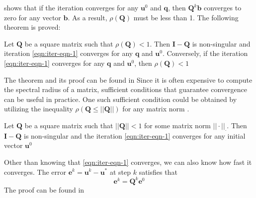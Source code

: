 shows that if the iteration converges for any $\boldsymbol{u}^0$ and $\boldsymbol{q}$, then $\boldsymbol{Q}^k\boldsymbol{b}$ converges to zero for any vector $\boldsymbol{b}$. As a result, $\rho(\boldsymbol{Q})$ must be less than 1. The following theorem is proved:
\begin{theorem}
Let $\boldsymbol{Q}$ be a square matrix such that $\rho(\boldsymbol{Q}) < 1$. Then $\boldsymbol{I} - \boldsymbol{Q}$ is non-singular and iteration \autoref{eqn:iter-eqn-1} converges for any $
\boldsymbol{q}$ and $\boldsymbol{u}^0$. Conversely, if the iteration \autoref{eqn:iter-eqn-1} converges for any $\boldsymbol{q}$ and $\boldsymbol{u}^0$, then $\rho(\boldsymbol{Q}) < 1$
\end{theorem}
The theorem and its proof can be found in \citep{doi:10.1137/1.9780898718003}
Since it is often expensive to compute the spectral radius of a matrix, sufficient conditions that guarantee convergence can be useful in practice. One such sufficient condition could be obtained by utilizing the inequality $\rho(\boldsymbol{Q} \leq ||\boldsymbol{Q}||)$ for any matrix norm \citep{doi:10.1137/1.9780898718003}.
\begin{corollary}
Let $\boldsymbol{Q}$ be a square matrix such that $||\boldsymbol{Q}|| < 1$  for some matrix norm $||\cdot||_\cdot$. Then $\boldsymbol{I} - \boldsymbol{Q}$ is non-singular and the iteration \autoref{eqn:iter-eqn-1} converges for any initial vector $\boldsymbol{u}^0$
\end{corollary}

Other than knowing that \autoref{eqn:iter-eqn-1} converges, we can also know how fast it converges. The error $\boldsymbol{e}^k = \boldsymbol{u}^k - \boldsymbol{u}^*$ at step $k$ satisfies that 
\begin{equation}
    \boldsymbol{e}^k = \boldsymbol{Q}^k \boldsymbol{e}^0
\end{equation}
The proof can be found in \citep{doi:10.1137/1.9780898718003}

